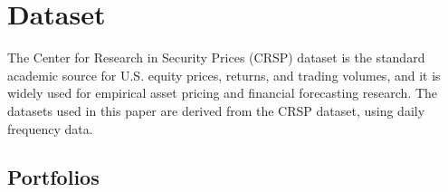 %
%
%
\providecommand{\text}[1]{\mathrm{#1}}

\section{Dataset}
The Center for Research in Security Prices (CRSP) dataset is the standard academic source for U.S. equity prices, returns, and trading volumes, and it is widely used for empirical asset pricing and financial forecasting research. The datasets used in this paper are derived from the CRSP dataset, using daily frequency data. 



\subsection{Portfolios}
\label{subsec:validation-portfolios}

